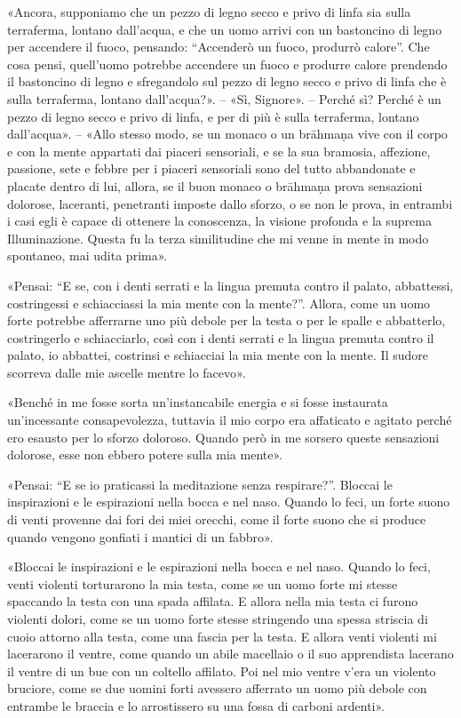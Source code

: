 «Ancora, supponiamo che un pezzo di legno secco e privo di linfa sia
sulla terraferma, lontano dall’acqua, e che un uomo arrivi con un
bastoncino di legno per accendere il fuoco, pensando: “Accenderò un
fuoco, produrrò calore”. Che cosa pensi, quell’uomo potrebbe accendere
un fuoco e produrre calore prendendo il bastoncino di legno e
sfregandolo sul pezzo di legno secco e privo di linfa che è sulla
terraferma, lontano dall’acqua?». – «Sì, Signore». – Perché sì? Perché è
un pezzo di legno secco e privo di linfa, e per di più è sulla
terraferma, lontano dall’acqua». – «Allo stesso modo, se un monaco o un
brāhmaṇa vive con il corpo e con la mente appartati dai piaceri
sensoriali, e se la sua bramosia, affezione, passione, sete e febbre per
i piaceri sensoriali sono del tutto abbandonate e placate dentro di lui,
allora, se il buon monaco o brāhmaṇa prova sensazioni dolorose,
laceranti, penetranti imposte dallo sforzo, o se non le prova, in
entrambi i casi egli è capace di ottenere la conoscenza, la visione
profonda e la suprema Illuminazione. Questa fu la terza similitudine che
mi venne in mente in modo spontaneo, mai udita prima».


«Pensai: “E se, con i denti serrati e la lingua premuta contro il
palato, abbattessi, costringessi e schiacciassi la mia mente con la
mente?”. Allora, come un uomo forte potrebbe afferrarne uno più debole
per la testa o per le spalle e abbatterlo, costringerlo e schiacciarlo,
così con i denti serrati e la lingua premuta contro il palato, io
abbattei, costrinsi e schiacciai la mia mente con la mente. Il sudore
scorreva dalle mie ascelle mentre lo facevo».


«Benché in me fosse sorta un’instancabile energia e si fosse instaurata
un’incessante consapevolezza, tuttavia il mio corpo era affaticato e
agitato perché ero esausto per lo sforzo doloroso. Quando però in me
sorsero queste sensazioni dolorose, esse non ebbero potere sulla mia
mente».


«Pensai: “E se io praticassi la meditazione senza respirare?”. Bloccai
le inspirazioni e le espirazioni nella bocca e nel naso. Quando lo feci,
un forte suono di venti provenne dai fori dei miei orecchi, come il
forte suono che si produce quando vengono gonfiati i mantici di un
fabbro».


«Bloccai le inspirazioni e le espirazioni nella bocca e nel naso. Quando
lo feci, venti violenti torturarono la mia testa, come se un uomo forte
mi stesse spaccando la testa con una spada affilata. E allora nella mia
testa ci furono violenti dolori, come se un uomo forte stesse stringendo
una spessa striscia di cuoio attorno alla testa, come una fascia per la
testa. E allora venti violenti mi lacerarono il ventre, come quando un
abile macellaio o il suo apprendista lacerano il ventre di un bue con un
coltello affilato. Poi nel mio ventre v’era un violento bruciore, come
se due uomini forti avessero afferrato un uomo più debole con entrambe
le braccia e lo arrostissero su una fossa di carboni ardenti».


